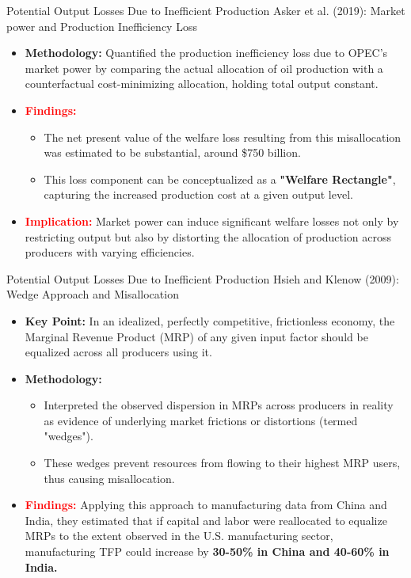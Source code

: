 \documentclass[aspectratio=169]{beamer}  %
\begin{document}
\begin{frame}{Potential Output Losses Due to Inefficient Production}
    Asker et al. (2019): Market power and Production Inefficiency Loss
    \begin{itemize}
        \item \textbf{Methodology:} Quantified the production inefficiency loss due to OPEC's market power by comparing the actual allocation of oil production with a counterfactual cost-minimizing allocation, holding total output constant.
        \item \textcolor{red}{\textbf{Findings:}}
        \begin{itemize}
            \item The net present value of the welfare loss resulting from this misallocation was estimated to be substantial, around \$750 billion. 
            \item This loss component can be conceptualized as a \textbf{"Welfare Rectangle"}, capturing the increased production cost at a given output level.
        \end{itemize}
        \item \textcolor{red}{\textbf{Implication:}} Market power can induce significant welfare losses not only by restricting output but also by distorting the allocation of production across producers with varying efficiencies.
    \end{itemize}
\end{frame}


\begin{frame}{Potential Output Losses Due to Inefficient Production}
    Hsieh and Klenow (2009): Wedge Approach and Misallocation
    \begin{itemize}
        \item \textbf{Key Point:} In an idealized, perfectly competitive, frictionless economy, the Marginal Revenue Product (MRP) of any given input factor should be equalized across all producers using it.
        \item \textbf{Methodology:} 
        \begin{itemize}  
            \item Interpreted the observed dispersion in MRPs across producers in reality as evidence of underlying market frictions or distortions (termed "wedges").
            \item These wedges prevent resources from flowing to their highest MRP users, thus causing misallocation.
        \end{itemize}
        \item \textcolor{red}{\textbf{Findings:}} Applying this approach to manufacturing data from China and India, they estimated that if capital and labor were reallocated to equalize MRPs to the extent observed in the U.S. manufacturing sector, manufacturing TFP could increase by \textbf{30-50\% in China and 40-60\% in India.}
    \end{itemize}
\end{frame}
\end{document}
